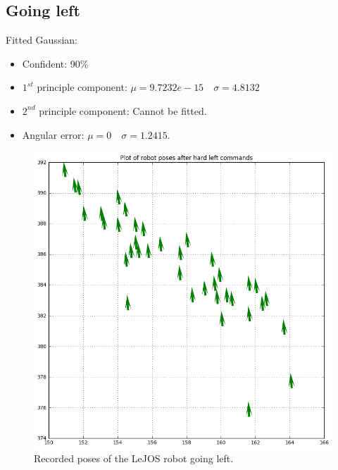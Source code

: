 \documentclass[paper=a4, fontsize=11pt]{scrartcl} %
\begin{document}
    \subsection{Going left}
        Fitted Gaussian:
        \begin{itemize}
        	\item Confident: 90\%
    	    \item $1^{st}$ principle component: $\mu = 9.7232e-15 \quad \sigma = 4.8132$
    	    \item $2^{nd}$ principle component: Cannot be fitted.
    	    \item Angular error: $\mu = 0 \quad \sigma = 1.2415$.
        \end{itemize}
    \begin{figure}[h!]
        \begin{center}
            \setlength{\fboxsep}{0.5pt} %
            \setlength{\fboxrule}{0.5pt}
            \includegraphics[width=12cm,fbox]{images/poses_plot_4_left.png}
            \caption{Recorded poses of the LeJOS robot going left.}
        \end{center}
    \end{figure}
\end{document}

